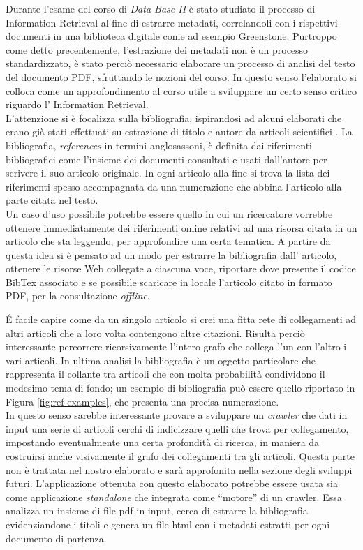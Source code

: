 Durante l'esame del corso di \textit{Data Base II} è stato studiato il processo di Information Retrieval al fine di estrarre metadati, correlandoli con i rispettivi documenti in una biblioteca digitale come ad esempio Greenstone. Purtroppo come detto precentemente, l'estrazione dei metadati non è un processo standardizzato, è stato perciò necessario elaborare un processo di analisi del testo del documento PDF, sfruttando le nozioni del corso. In questo senso l'elaborato si colloca come un approfondimento al corso utile a sviluppare un certo senso critico riguardo l' Information Retrieval.\\
L'attenzione si è focalizza sulla bibliografia, ispirandosi ad alcuni elaborati che erano già stati effettuati su estrazione di titolo e autore da articoli scientifici \cite{Tarocchi}. La bibliografia, \textit{references} in  termini anglosassoni, è definita dai riferimenti bibliografici come l'insieme dei documenti consultati e usati dall'autore per scrivere il suo articolo originale. In ogni articolo alla fine si trova la lista dei riferimenti spesso accompagnata da una numerazione che abbina l'articolo alla parte citata nel testo.
\\ 
Un caso d'uso possibile potrebbe essere quello in cui un ricercatore vorrebbe ottenere immediatamente dei riferimenti online relativi ad una risorsa citata in un articolo che sta leggendo, per approfondire una certa tematica. A partire da questa idea si è pensato ad un modo per estrarre la bibliografia dall' articolo, ottenere le risorse Web collegate a ciascuna voce, riportare dove presente il codice BibTex associato e se possibile scaricare in locale l'articolo citato in formato PDF, per la consultazione \textit{offline}.

\'E facile capire come da un singolo articolo si crei una fitta rete di collegamenti ad altri articoli che a loro volta contengono altre citazioni. Risulta perciò interessante percorrere ricorsivamente l'intero grafo che collega l'un con l'altro i vari articoli. In ultima analisi la bibliografia è un oggetto particolare che rappresenta il collante tra articoli che con molta probabilità condividono il medesimo tema di fondo; un esempio di bibliografia può essere quello riportato in Figura \ref{fig:ref-examples}, che presenta una precisa numerazione.
\\
In questo senso sarebbe interessante provare a sviluppare un \textit{crawler} che dati in input una serie di articoli cerchi di indicizzare quelli che trova per collegamento, impostando eventualmente una certa profondità di ricerca, in maniera da costruirsi anche visivamente il grafo dei collegamenti tra gli articoli. Questa parte non è trattata nel nostro elaborato e sarà approfonita nella sezione degli sviluppi futuri. L'applicazione ottenuta con questo elaborato potrebbe essere usata sia come applicazione \textit{standalone} che integrata come ``motore'' di un crawler. Essa analizza un insieme di file pdf in input, cerca di estrarre la bibliografia evidenziandone i titoli e genera un file html con i metadati estratti per ogni documento di partenza. 


